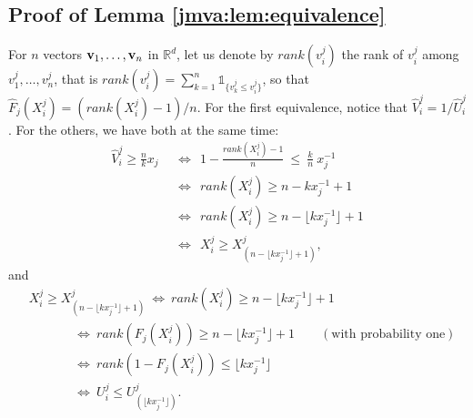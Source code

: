 \subsection{Proof of Lemma \ref{jmva:lem:equivalence}}
For $n$ vectors $\mathbf v_1,\ldots,\mathbf v_n$ in $\mathbb{R}^d$, let us denote by $rank(v_i^j)$ the rank of $v_i^j$ among $v_1^j,\ldots,v_n^j$, that is $rank(v_i^j)=\sum_{k=1}^n \mathds{1}_{\{v_k^j \le v_i^j\}}$, so that $\hat F_j(X_i^j) = (rank(X_i^j)-1)/n$. For the first equivalence, notice that $\hat V_i^j = 1 / \hat U_i^j$.
For the others, we have both at the same time:
\begin{align*}
\hat V_i^j \ge \frac{n}{k} x_j  &~~\Leftrightarrow~~ 1-\frac{rank(X_i^j)-1}{n} ~\le~ \frac{k}{n}~x_j^{-1} 
\\ &~~\Leftrightarrow~~ rank(X_i^j) \ge n-kx_j^{-1} + 1 
\\ &~~\Leftrightarrow~~ rank(X_i^j) \ge n-\lfloor kx_j^{-1}\rfloor + 1 
\\ &~~\Leftrightarrow~~ X_i^j \ge X_{(n-\lfloor kx_j^{-1}\rfloor +1)}^j, 
\end{align*}
and
\begin{align*}
& X_i^j \ge X_{(n-\lfloor  kx_j^{-1} \rfloor +1)}^j ~\Leftrightarrow~
 rank(X_i^j) \ge n-\lfloor  kx_j^{-1} \rfloor+1 \\
&~~~~~~~~~~~~~~~~\Leftrightarrow~  rank( F_j(X_i^j)) \ge n-\lfloor
 kx_j^{-1}\rfloor+1 \qquad(\text{with probability one})\\ 
&~~~~~~~~~~~~~~~~\Leftrightarrow~  rank(1-F_j(X_i^j)) \le \lfloor kx_j^{-1}\rfloor\\
&~~~~~~~~~~~~~~~~\Leftrightarrow~  U_i^j \le U_{(\lfloor kx_j^{-1}\rfloor)}^j.
\end{align*}


